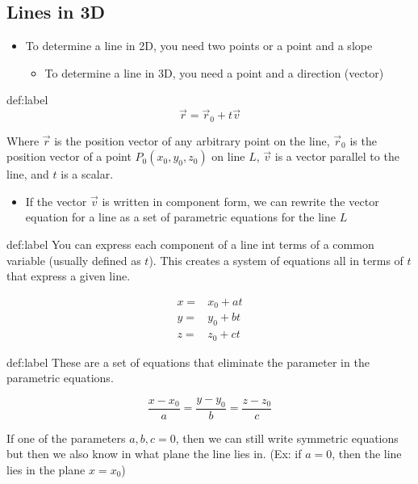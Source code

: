 \documentclass{package/notes}
\begin{document}
\subsection{Lines in 3D}

\begin{itemize}
	\item To determine a line in 2D, you need two points or a point and a slope
	\begin{itemize}
		\item To determine a line in 3D, you need a point and a direction (vector)
	\end{itemize}
\end{itemize}

\begin{definition}{def:label}
	$$\vec r = \vec r_0 + t\vec v$$

	Where $\vec r$ is the position vector of any arbitrary point on the line, $\vec r_0$ is the position vector of a point $P_0(x_0,y_0,z_0)$ on line $L$, $\vec v$ is a vector parallel to the line, and $t$ is a scalar.
\end{definition}

\begin{itemize}
	\item If the vector $\vec v$ is written in component form, we can rewrite the vector equation for a line as a set of parametric equations for the line $L$ 
\end{itemize}

\newpage
\begin{definition}{def:label}
	You can express each component of a line int terms of a common variable (usually defined as $t$). This creates a system of equations all in terms of $t$ that express a given line.

	$$
	\begin{aligned}
		x =& x_0 + at\\
		y =& y_0+bt\\
		z =& z_0+ct
	\end{aligned}
	$$
\end{definition} %

\begin{definition}{def:label}
	These are a set of equations that eliminate the parameter in the parametric equations.

	$$
	\frac{x-x_0}{a}=\frac{y-y_0}{b}=\frac{z-z_0}{c}
	$$

	If one of the parameters $a,b,c = 0$, then we can still write symmetric equations but then we also know in what plane the line lies in. (Ex: if $a= 0$, then the line lies in the plane $x=x_0$)
\end{definition} %
\end{document}
